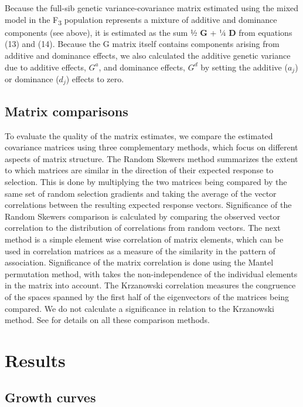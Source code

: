 \begin{refsection}
Because the full-sib genetic variance-covariance matrix estimated using
the mixed model in the F\textsubscript{3} population represents a
mixture of additive and dominance components (see above), it is
estimated as the sum ½ \textbf{G} + ¼ \textbf{D} from equations (13)
and (14). Because the G matrix itself contains components arising from
additive and dominance effects, we also calculated the additive genetic
variance due to additive effects, \(G^{a}\), and dominance effects,
\(G^{d}\) by setting the additive (\(a_{j}\)) or dominance (\(d_{j}\))
effects to zero.

\subsection{Matrix comparisons}

To evaluate the quality of the matrix estimates, we compare the estimated covariance matrices using three complementary
methods, which focus on different aspects of matrix structure. The
Random Skewers method \parencite{Cheverud2007-yp} summarizes the extent to which matrices are
similar in the direction of their expected response to selection. This is done by
multiplying the two matrices being compared by the same set of random
selection gradients and taking the average of the vector correlations
between the resulting expected response vectors. Significance of the
Random Skewers comparison is calculated by comparing the observed vector
correlation to the distribution of correlations from random vectors. The
next method is a simple element wise correlation of matrix elements,
which can be used in correlation matrices as a measure of the similarity
in the pattern of association. Significance of the matrix correlation is
done using the Mantel permutation method, with takes the
non-independence of the individual elements in the matrix into account.
The Krzanowski correlation measures the congruence of the spaces spanned
by the first half of the eigenvectors of the matrices being compared. We
do not calculate a significance in relation to the Krzanowski method.
See \parencite{Melo2015-kf} for details on all these comparison methods.

\section{Results}

\subsection{Growth curves}


\end{refsection}
